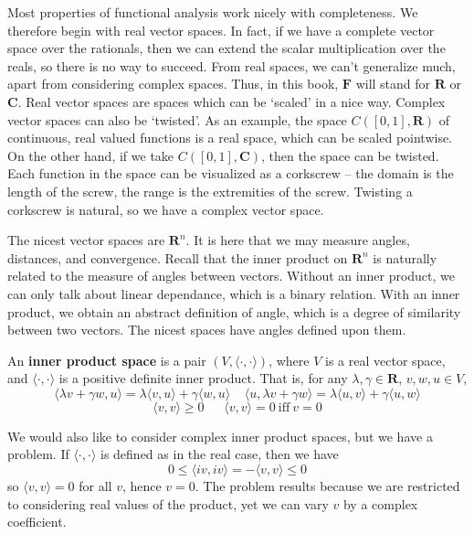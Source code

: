 Most properties of functional analysis work nicely with completeness. We therefore begin with real vector spaces. In fact, if we have a complete vector space over the rationals, then we can extend the scalar multiplication over the reals, so there is no way to succeed. From real spaces, we can't generalize much, apart from considering complex spaces. Thus, in this book, $\mathbf{F}$ will stand for $\mathbf{R}$ or $\mathbf{C}$. Real vector spaces are spaces which can be `scaled' in a nice way. Complex vector spaces can also be `twisted'. As an example, the space $C([0,1], \mathbf{R})$ of continuous, real valued functions is a real space, which can be scaled pointwise. On the other hand, if we take $C([0,1], \mathbf{C})$, then the space can be twisted. Each function in the space can be visualized as a corkscrew -- the domain is the length of the screw, the range is the extremities of the screw. Twisting a corkscrew is natural, so we have a complex vector space.

The nicest vector spaces are $\mathbf{R}^n$. It is here that we may measure angles, distances, and convergence. Recall that the inner product on $\mathbf{R}^n$ is naturally related to the measure of angles between vectors. Without an inner product, we can only talk about linear dependance, which is a binary relation. With an inner product, we obtain an abstract definition of angle, which is a degree of similarity between two vectors. The nicest spaces have angles defined upon them.

\begin{definition}
    An {\bf inner product space} is a pair $(V, \langle \cdot, \cdot \rangle)$, where $V$ is a real vector space, and $\langle \cdot, \cdot \rangle$ is a positive definite inner product. That is, for any $\lambda, \gamma \in \mathbf{R}$, $v,w, u \in V$,
    \begin{equation} \langle \lambda v + \gamma w, u \rangle = \lambda \langle v, u \rangle + \gamma \langle w, u \rangle\ \ \ \ \ \langle u, \lambda v + \gamma w \rangle = \lambda \langle u, v \rangle + \gamma \langle u, w\rangle \end{equation}
    \begin{equation} \langle v, v \rangle \geq 0\ \ \ \ \ \ \ \langle v, v \rangle = 0\ \text{iff}\ v = 0 \end{equation}
\end{definition}

We would also like to consider complex inner product spaces, but we have a problem. If $\langle \cdot, \cdot \rangle$ is defined as in the real case, then we have
%
\[ 0 \leq \langle i v, i v \rangle = - \langle v, v \rangle \leq 0 \]
%
so $\langle v, v \rangle = 0$ for all $v$, hence $v = 0$. The problem results because we are restricted to considering real values of the product, yet we can vary $v$ by a complex coefficient.

